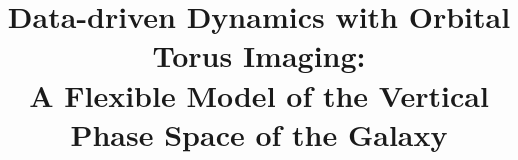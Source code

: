 




\documentclass[modern]{aastex631}

\usepackage{microtype}  %
\usepackage{amsmath}
\usepackage{amsfonts}
\usepackage{amssymb}
\usepackage{booktabs}
\usepackage{graphicx}

\usepackage{enumitem}

\setlength{\parindent}{1.1\baselineskip}
\addtolength{\topmargin}{-0.2in}
\addtolength{\textheight}{0.4in}
\sloppy\sloppypar\raggedbottom\frenchspacing

\graphicspath{{figures/}}


\newcommand{\freqzero}{\ensuremath{\Omega_0}}
\newcommand{\mmax}{\ensuremath{M}}
\newcommand{\rz}{\ensuremath{r_z}}
\newcommand{\rzp}{\ensuremath{\tilde{r}_z}}
\newcommand{\thz}{\ensuremath{\theta_z}}
\newcommand{\thzp}{\ensuremath{\tilde{\theta}_z}}

\shorttitle{}



\title{
    Data-driven Dynamics with Orbital Torus Imaging:  \\
    A Flexible Model of the Vertical Phase Space of the Galaxy
}

\newcommand{\affcca}{
    Center for Computational Astrophysics, Flatiron Institute, \\
    162 Fifth Ave, New York, NY 10010, USA
}


